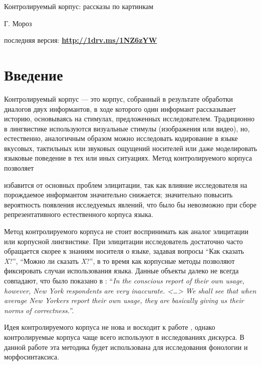 

\begin{center}{\Large Контролируемый корпус: рассказы по картинкам}
\end{center}
\begin{flushright}
	{\footnotesize Г. Мороз}
\end{flushright}
{\noindent\footnotesize последняя версия: \textbf{\href{http://1drv.ms/1NZ6zYW}{http://1drv.ms/1NZ6zYW}}}
\vspace{5mm}
\section{Введение}
\noindent Контролируемый корпус --- это корпус, собранный в результате обработки диалогов двух информантов, в ходе которого один информант рассказывает историю, основываясь на стимулах, предложенных исследователем. Традиционно в лингвистике используются визуальные стимулы (изображения или видео), но, естественно, аналогичным образом можно исследовать кодирование в языке вкусовых, тактильных или звуковых ощущений носителей или даже моделировать языковые поведение в тех или иных ситуациях. Метод контролируемого корпуса позволяет
\begin{itemize}
\mytem  избавится от основных проблем элицитации, так как влияние исследователя на порождаемое информантом значительно снижается;
\mytem значительно повысить вероятность появления исследуемых явлений, что было бы невозможно при сборе репрезентативного естественного корпуса языка.
\end{itemize}
Метод контролируемого корпуса не стоит воспринимать как аналог элицитации или корпусной лингвистике. При элицитации исследователь достаточно часто обращается скорее к знаниям носителя о языке, задавая вопросы ``Как сказать \textit{X}?'', ``Можно ли сказать \textit{X}?'', в то время как корпусные методы позволяют фиксировать случаи использования языка. Данные объекты далеко не всегда совпадают, что было показано в \citep[300]{labov64}: ``\textit{In the conscious report of their own usage, however, New York respondents are very inaccurate. <\dots> We shall see that when average New Yorkers report their own usage, they are basically giving us their norms of correctness.}''.
\par Идея контролируемого корпуса не нова и восходит к работе \citep{chafe80}, однако контролируемые корпуса чаще всего используют в исследованиях дискурса. В данной работе эта методика будет использована для исследования фонологии и морфосинтаксиса.
